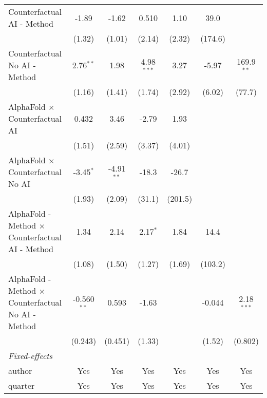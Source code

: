 \begin{tabular}{lcccccc}
   Counterfactual AI - Method                                 & -1.89         & -1.62        & 0.510        & 1.10        & 39.0    &   \\   
                                                              & (1.32)        & (1.01)       & (2.14)       & (2.32)      & (174.6) &   \\   
   Counterfactual No AI - Method                              & 2.76$^{**}$   & 1.98         & 4.98$^{***}$ & 3.27        & -5.97   & 169.9$^{**}$\\   
                                                              & (1.16)        & (1.41)       & (1.74)       & (2.92)      & (6.02)  & (77.7)\\   
   AlphaFold $\times$ Counterfactual AI                       & 0.432         & 3.46         & -2.79        & 1.93        &         &   \\   
                                                              & (1.51)        & (2.59)       & (3.37)       & (4.01)      &         &   \\   
   AlphaFold $\times$ Counterfactual No AI                    & -3.45$^{*}$   & -4.91$^{**}$ & -18.3        & -26.7       &         &   \\   
                                                              & (1.93)        & (2.09)       & (31.1)       & (201.5)     &         &   \\   
   AlphaFold - Method $\times$ Counterfactual AI - Method     & 1.34          & 2.14         & 2.17$^{*}$   & 1.84        & 14.4    &   \\   
                                                              & (1.08)        & (1.50)       & (1.27)       & (1.69)      & (103.2) &   \\   
   AlphaFold - Method $\times$ Counterfactual No AI - Method  & -0.560$^{**}$ & 0.593        & -1.63        &             & -0.044  & 2.18$^{***}$\\   
                                                              & (0.243)       & (0.451)      & (1.33)       &             & (1.52)  & (0.802)\\   
   \midrule
   \emph{Fixed-effects}\\
   author                                                     & Yes           & Yes          & Yes          & Yes         & Yes     & Yes\\  
   quarter                                                    & Yes           & Yes          & Yes          & Yes         & Yes     & Yes\\  

\end{tabular}
